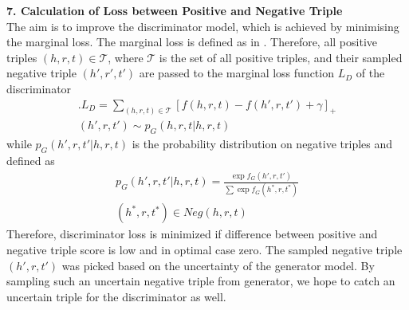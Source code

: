 \textbf{7. Calculation of Loss between Positive and Negative Triple}\\

The aim is to improve the discriminator model, which is achieved by minimising the marginal loss.
The marginal loss is defined as in .
Therefore, all positive triples $(h,r,t) \in \mathcal{T}$, where $\mathcal{T}$ is the set of all positive triples, and their sampled negative triple $(h',r', t')$  are passed to the marginal loss function $L_D$ of the discriminator
\begin{multline} \label{eq:marginalloss2}.
    L_D =\sum_{(h,r,t)\in\mathcal{T}}[f(h,r,t)-f(h',r,t')+\gamma]_+\\
    (h',r,t') \sim p_G(h,r,t|h,r,t) 
\end{multline}
while $p_G(h', r, t'|h, r, t)$ is the probability distribution on negative triples and defined as \cite{cai2017kbgan}
\begin{multline}
    p_G(h',r,t'|h,r,t)=\frac{\exp f_G(h',r,t')}{\sum\exp f_G(h^*,r,t^*)} \\
    (h^*,r,t^*)\in Neg(h,r,t)
\end{multline}
Therefore, discriminator loss is minimized if difference between positive and negative triple score is low and in optimal case zero.
The sampled negative triple $(h',r,t')$ was picked based on the uncertainty of the generator model.
By sampling such an uncertain negative triple from generator, we hope to catch an uncertain triple for the discriminator as well.
